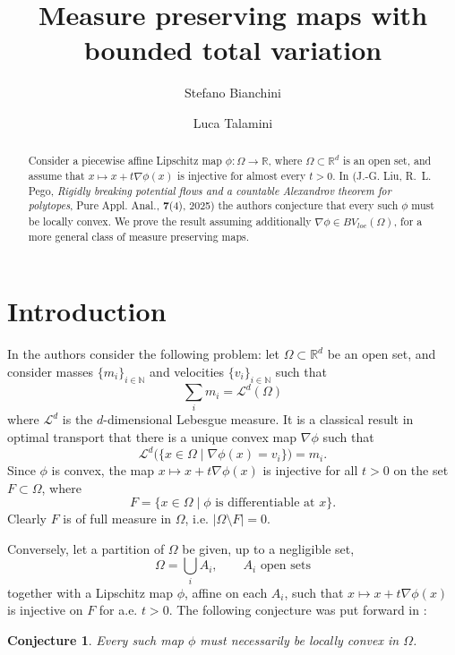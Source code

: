 \documentclass[11pt, twoside, reqno]{amsart}
\title{Measure preserving maps with bounded total variation}
\author{Stefano Bianchini}
\author{Luca Talamini \orcidlink{0009-0008-5147-5184}}
\newcounter{assu}
\theoremstyle{definition} \newtheorem{definition}{Definition}[section]
\theoremstyle{definition} \newtheorem{remark}[definition]{Remark}
\theoremstyle{plain} \newtheorem{lemma}[definition]{Lemma}
\theoremstyle{plain} \newtheorem{proposition}[definition]{Proposition}
\theoremstyle{plain} \newtheorem{theorem}[definition]{Theorem}
\theoremstyle{plain} \newtheorem{corollary}[definition]{Corollary}
\theoremstyle{definition} \newtheorem{example}[definition]{Example}
\theoremstyle{plain} \newtheorem{claim}[clai]{Claim}
\theoremstyle{definition} \newtheorem{assumption}[definition]{Assumption}
\newcommand{\1}{\mathbbm 1}
\numberwithin{equation}{section} %
\theoremstyle{plain} \newtheorem*{theorem*}{Theorem}
\theoremstyle{plain} \newtheorem{mthm}[maintheorem]{Main Theorem}
\theoremstyle{plain} \newtheorem*{mthm*}{Main Theorem}
\theoremstyle{plain} \newtheorem*{conjecture*}{Conjecture}
\theoremstyle{plain} \newtheorem{conjecture}[definition]{Conjecture}
\theoremstyle{plain} \newtheorem*{problem*}{Problem}
\begin{document}
\maketitle

\begin{abstract}
   Consider a piecewise affine Lipschitz map $\phi : \Omega \to \mathbb R$, where $\Omega \subset \mathbb R^d$ is an open set, and assume that $x \mapsto x + t \nabla \phi(x)$ is injective for almost every $t > 0$.  In (J.-G. Liu, R.~L. Pego, \emph{Rigidly breaking potential flows and a countable Alexandrov theorem for polytopes}, Pure Appl. Anal., \textbf{7}(4),  2025) the authors conjecture that every such $\phi$ must be locally convex. We prove the result assuming additionally $\nabla \phi \in BV_{loc}(\Omega)$, for a more general class of measure preserving maps. 
\end{abstract}

\section{Introduction}
In \cite{LP25} the authors consider the following problem: let $\Omega \subset \mathbb R^d$ be an open set, and consider masses $\{m_i\}_{i \in \mathbb N}$ and velocities $\{v_i\}_{i \in \mathbb N}$ such that
$$
\sum_i m_i = \mathscr L^d(\Omega)
$$
where $\mathscr L^d$ is the $d$-dimensional Lebesgue measure. It is a classical result in optimal transport \cite{Bre91} that there is a unique convex map $\nabla \phi$ such that 
$$
\mathscr L^d \Big(\big\{ x \in \Omega \; | \; \nabla \phi(x) = v_i \big\}\Big) = m_i.
$$
Since $\phi$ is convex, the map $x \mapsto x + t \nabla \phi(x)$ is injective for all $t > 0$ on the set $F \subset \Omega$, where
$$
F = \Big\{ x \in \Omega \; | \; \text{$\phi$ is differentiable at $x$} \Big\}.
$$
Clearly $F$ is of full measure in $\Omega$, i.e. $|\Omega \setminus F| = 0$.

\vspace{0.3cm}
Conversely, let a partition of $\Omega$ be given, up to a negligible set,
$$
\Omega = \bigcup_i A_i, \qquad \text{$A_i$ open sets}
$$
together with a Lipschitz map $\phi$, affine on each $A_i$, such that $x \mapsto x + t \nabla \phi(x)$ is injective on $F$ for a.e. $t > 0$. The following conjecture was put forward in \cite{LP25}:

\begin{conjecture}  
Every such  map $\phi$ must necessarily be locally convex in $\Omega$.
\end{conjecture}
\end{document}
